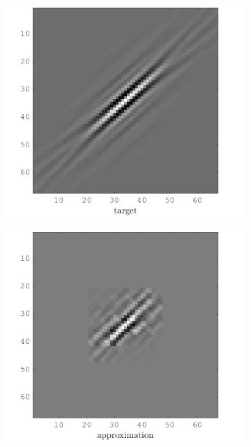 \begin{figure}[!h]\centering
    \begin{subfigure}[b]{0.49\textwidth}\centering
    \includegraphics[width=\textwidth]{figures/xp/xp_128x128_sc2_angl1_K3_S3_node2_target.png}
    \end{subfigure}
\begin{subfigure}[b]{0.49\textwidth}\centering
\includegraphics[width=\textwidth]{figures/xp/xp_128x128_sc2_angl1_K3_S3_node2_approx.png}

\end{subfigure}
\end{figure}
